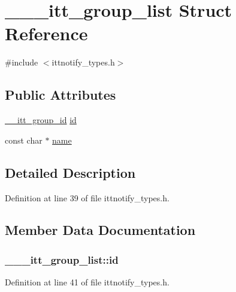 \hypertarget{struct______itt__group__list}{\section{\-\_\-\-\_\-\-\_\-itt\-\_\-group\-\_\-list Struct Reference}
\label{struct______itt__group__list}
}


{\ttfamily \#include $<$ittnotify\-\_\-types.\-h$>$}

\subsection*{Public Attributes}
\begin{DoxyCompactItemize}
\item 
\hyperlink{ittnotify__types_8h_ab43d42e38047ed421321091868ff992b}{\-\_\-\-\_\-itt\-\_\-group\-\_\-id} \hyperlink{struct______itt__group__list_a0be1db69af1d8a515915bf594f0f9a7e}{id}
\item 
const char $\ast$ \hyperlink{struct______itt__group__list_a7ec0e147be42b6d715189f283d6d6784}{name}
\end{DoxyCompactItemize}


\subsection{Detailed Description}


Definition at line 39 of file ittnotify\-\_\-types.\-h.



\subsection{Member Data Documentation}
\hypertarget{struct______itt__group__list_a0be1db69af1d8a515915bf594f0f9a7e}{
\subsubsection[{id}]{ \-\_\-\-\_\-\-\_\-itt\-\_\-group\-\_\-list\-::id}}\label{struct______itt__group__list_a0be1db69af1d8a515915bf594f0f9a7e}


Definition at line 41 of file ittnotify\-\_\-types.\-h.


